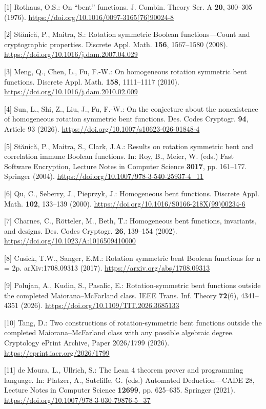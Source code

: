 \documentclass[11pt,a4paper]{article}
\begin{document}
[1] Rothaus, O.S.: On ``bent'' functions. J. Combin. Theory Ser. A \textbf{20}, 300--305 (1976). \url{https://doi.org/10.1016/0097-3165(76)90024-8}

[2] St\u{a}nic\u{a}, P., Maitra, S.: Rotation symmetric Boolean functions---Count and cryptographic properties. Discrete Appl. Math. \textbf{156}, 1567--1580 (2008). \url{https://doi.org/10.1016/j.dam.2007.04.029}

[3] Meng, Q., Chen, L., Fu, F.-W.: On homogeneous rotation symmetric bent functions. Discrete Appl. Math. \textbf{158}, 1111--1117 (2010). \url{https://doi.org/10.1016/j.dam.2010.02.009}

[4] Sun, L., Shi, Z., Liu, J., Fu, F.-W.: On the conjecture about the nonexistence of homogeneous rotation symmetric bent functions. Des. Codes Cryptogr. \textbf{94}, Article 93 (2026). \url{https://doi.org/10.1007/s10623-026-01848-4}

[5] St\u{a}nic\u{a}, P., Maitra, S., Clark, J.A.: Results on rotation symmetric bent and correlation immune Boolean functions. In: Roy, B., Meier, W. (eds.) Fast Software Encryption, Lecture Notes in Computer Science \textbf{3017}, pp. 161--177. Springer (2004). \url{https://doi.org/10.1007/978-3-540-25937-4_11}

[6] Qu, C., Seberry, J., Pieprzyk, J.: Homogeneous bent functions. Discrete Appl. Math. \textbf{102}, 133--139 (2000). \url{https://doi.org/10.1016/S0166-218X(99)00234-6}

[7] Charnes, C., Rötteler, M., Beth, T.: Homogeneous bent functions, invariants, and designs. Des. Codes Cryptogr. \textbf{26}, 139--154 (2002). \url{https://doi.org/10.1023/A:1016509410000}

[8] Cusick, T.W., Sanger, E.M.: Rotation symmetric bent Boolean functions for n = 2p. arXiv:1708.09313 (2017). \url{https://arxiv.org/abs/1708.09313}

[9] Polujan, A., Kudin, S., Pasalic, E.: Rotation-symmetric bent functions outside the completed Maiorana--McFarland class. IEEE Trans. Inf. Theory \textbf{72}(6), 4341--4351 (2026). \url{https://doi.org/10.1109/TIT.2026.3685133}

[10] Tang, D.: Two constructions of rotation-symmetric bent functions outside the completed Maiorana--McFarland class with any possible algebraic degree. Cryptology ePrint Archive, Paper 2026/1799 (2026). \url{https://eprint.iacr.org/2026/1799}

[11] de Moura, L., Ullrich, S.: The Lean 4 theorem prover and programming language. In: Platzer, A., Sutcliffe, G. (eds.) Automated Deduction---CADE 28, Lecture Notes in Computer Science \textbf{12699}, pp. 625--635. Springer (2021). \url{https://doi.org/10.1007/978-3-030-79876-5_37}
\end{document}
